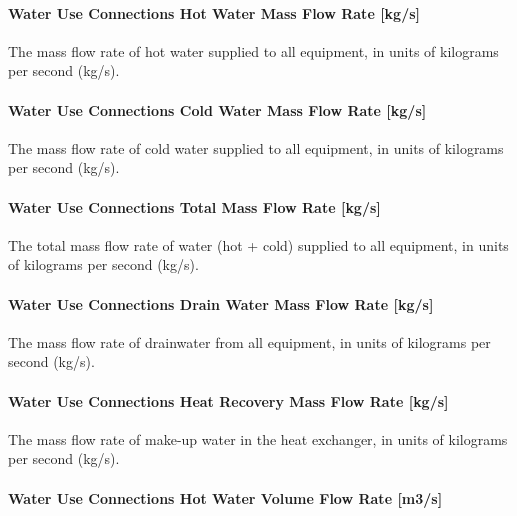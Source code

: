 \paragraph{Water Use Connections Hot Water Mass Flow Rate {[}kg/s{]}}\label{water-use-connections-hot-water-mass-flow-rate-kgs}

The mass flow rate of hot water supplied to all equipment, in units of kilograms per second (kg/s).

\paragraph{Water Use Connections Cold Water Mass Flow Rate {[}kg/s{]}}\label{water-use-connections-cold-water-mass-flow-rate-kgs}

The mass flow rate of cold water supplied to all equipment, in units of kilograms per second (kg/s).

\paragraph{Water Use Connections Total Mass Flow Rate {[}kg/s{]}}\label{water-use-connections-total-mass-flow-rate-kgs}

The total mass flow rate of water (hot + cold) supplied to all equipment, in units of kilograms per second (kg/s).

\paragraph{Water Use Connections Drain Water Mass Flow Rate {[}kg/s{]}}\label{water-use-connections-drain-water-mass-flow-rate-kgs}

The mass flow rate of drainwater from all equipment, in units of kilograms per second (kg/s).

\paragraph{Water Use Connections Heat Recovery Mass Flow Rate {[}kg/s{]}}\label{water-use-connections-heat-recovery-mass-flow-rate-kgs}

The mass flow rate of make-up water in the heat exchanger, in units of kilograms per second (kg/s).

\paragraph{Water Use Connections Hot Water Volume Flow Rate {[}m3/s{]}}\label{water-use-connections-hot-water-volume-flow-rate-m3s}

